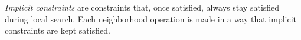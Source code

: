 \emph{Implicit constraints} are constraints that, once satisfied, always stay satisfied during local search. 
Each neighborhood operation is made in a way that implicit constraints are kept satisfied.   